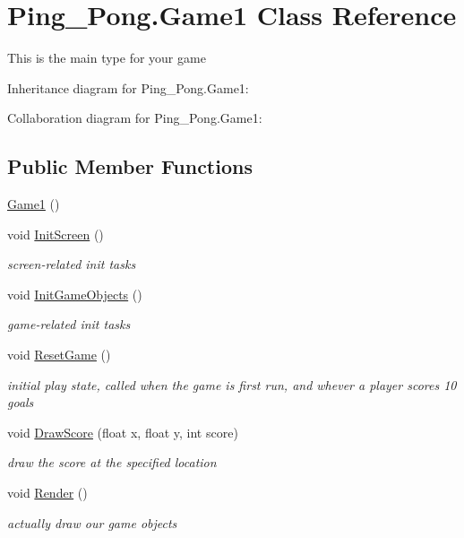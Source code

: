 \hypertarget{class_ping___pong_1_1_game1}{}\section{Ping\+\_\+\+Pong.\+Game1 Class Reference}
\label{class_ping___pong_1_1_game1}


This is the main type for your game  




Inheritance diagram for Ping\+\_\+\+Pong.\+Game1\+:


Collaboration diagram for Ping\+\_\+\+Pong.\+Game1\+:
\subsection*{Public Member Functions}
\begin{DoxyCompactItemize}
\item 
\hyperlink{class_ping___pong_1_1_game1_ab146cd91df1ef58f9a58935843ed787b}{Game1} ()
\item 
void \hyperlink{class_ping___pong_1_1_game1_a06c80c174c822247fb58b9ce3d6c18b2}{Init\+Screen} ()
\begin{DoxyCompactList}\small\item\em screen-\/related init tasks \end{DoxyCompactList}\item 
void \hyperlink{class_ping___pong_1_1_game1_a18d2c9e0d2bb1f3432c54781a8c822e7}{Init\+Game\+Objects} ()
\begin{DoxyCompactList}\small\item\em game-\/related init tasks \end{DoxyCompactList}\item 
void \hyperlink{class_ping___pong_1_1_game1_a30e3122abc5d6d6555b394ef9dfea097}{Reset\+Game} ()
\begin{DoxyCompactList}\small\item\em initial play state, called when the game is first run, and whever a player scores 10 goals \end{DoxyCompactList}\item 
void \hyperlink{class_ping___pong_1_1_game1_a5e2d8c065ebbe30b5452d6e6366d21ff}{Draw\+Score} (float x, float y, int score)
\begin{DoxyCompactList}\small\item\em draw the score at the specified location \end{DoxyCompactList}\item 
void \hyperlink{class_ping___pong_1_1_game1_ad22887afd5e5fe23c2d5d218556046ee}{Render} ()
\begin{DoxyCompactList}\small\item\em actually draw our game objects \end{DoxyCompactList}\end{DoxyCompactItemize}
